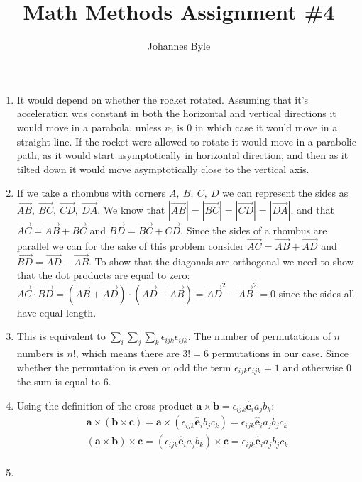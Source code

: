 \documentclass[12pt]{article}
\title{Math Methods Assignment \#4}
\author{Johannes Byle}
\begin{document}
  \maketitle
  \begin{enumerate}
    \item It would depend on whether the rocket rotated.
    Assuming that it's acceleration was constant in both the horizontal and vertical directions it would move in a parabola, unless $v_0$ is 0 in which case it would move in a straight line.
    If the rocket were allowed to rotate it would move in a parabolic path, as it would start asymptotically in horizontal direction, and then as it tilted down it would move asymptotically close to the vertical axis.
    \item If we take a rhombus with corners $A,\ B,\ C,\ D$ we can represent the sides as $\vec{AB},\ \vec{BC},\ \vec{CD},\ \vec{DA}$.
    We know that $|\vec{AB}|=|\vec{BC}|=|\vec{CD}|=|\vec{DA}|$, and that $\vec{AC}=\vec{AB}+\vec{BC}$ and $\vec{BD}=\vec{BC}+\vec{CD}$.
    Since the sides of a rhombus are parallel we can for the sake of this problem consider $\vec{AC}=\vec{AB}+\vec{AD}$ and $\vec{BD}=\vec{AD}-\vec{AB}$.
    To show that the diagonals are orthogonal we need to show that the dot products are equal to zero: $\vec{AC}\cdot\vec{BD}=\left(\vec{AB}+\vec{AD}\right)\cdot\left(\vec{AD}-\vec{AB}\right)=\vec{AD}^2-\vec{AB}^2=0$ since the sides all have equal length.
    \item This is equivalent to $\sum_i\sum_j\sum_k \epsilon_{ijk}\epsilon_{ijk}$.
    The number of permutations of $n$ numbers is $n!$, which means there are $3!=6$ permutations in our case.
    Since whether the permutation is even or odd the term $\epsilon_{ijk}\epsilon_{ijk}=1$ and otherwise 0 the sum is equal to 6.
    \item Using the definition of the cross product $\pmb{a}\times\pmb{b}=\epsilon_{ijk}\pmb{\hat{e}}_i a_j b_k$:
    \begin{gather*}
      \pmb{a}\times(\pmb{b}\times\pmb{c})=\pmb{a}\times(\epsilon_{ijk}\pmb{\hat{e}}_i b_j c_k)=\epsilon_{ijk}\pmb{\hat{e}}_i a_j b_j c_k\\
      (\pmb{a}\times\pmb{b})\times\pmb{c}=(\epsilon_{ijk}\pmb{\hat{e}}_i a_j b_k)\times\pmb{c}=\epsilon_{ijk}\pmb{\hat{e}}_i a_j b_j c_k\\
    \end{gather*}
    \item
  \end{enumerate}
\end{document}
